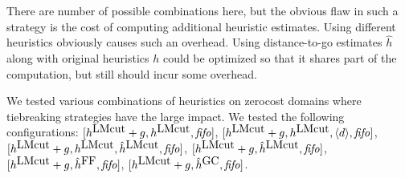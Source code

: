 There are number of possible combinations here, but the obvious flaw in
such a strategy is the cost of computing additional heuristic
estimates. Using different heuristics obviously causes such an
overhead. Using distance-to-go estimates $\hat{h}$ along with original
heuristics $h$ could be optimized so that it shares part of the
computation, but still should incur some overhead.

We tested various combinations of heuristics on zerocost domains where
tiebreaking strategies have the large impact.
We tested the following configurations:
$[h^{\mbox{LMcut}}+g,h^{\mbox{LMcut}},{\mbox{\textit{fifo}}}]$, 
$[h^{\mbox{LMcut}}+g,h^{\mbox{LMcut}},{\left<d\right>},{\mbox{\textit{fifo}}}]$, 
$[h^{\mbox{LMcut}}+g,h^{\mbox{LMcut}},\hat{h}^{\mbox{LMcut}},{\mbox{\textit{fifo}}}]$, 
$[h^{\mbox{LMcut}}+g,\hat{h}^{\mbox{LMcut}},{\mbox{\textit{fifo}}}]$, 
$[h^{\mbox{LMcut}}+g,\hat{h}^{\mbox{FF}},{\mbox{\textit{fifo}}}]$,
$[h^{\mbox{LMcut}}+g,\hat{h}^{\mbox{GC}},{\mbox{\textit{fifo}}}]$.

